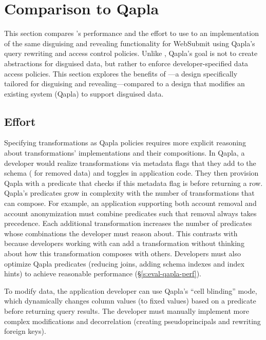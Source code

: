 \section{Comparison to Qapla}
\label{s:eval-qapla}

This section compares \sys's performance and the effort to use \sys to an
implementation of the same disguising and revealing functionality for WebSubmit
using Qapla’s query rewriting and access control policies. 
%
Unlike \sys, Qapla's goal is not to create abstractions for disguised data, but rather to enforce
developer-specified data access policies.
%
This section explores the benefits of \sys---a design specifically tailored for
disguising and revealing---compared to a design that modifies an existing system
(\ie Qapla) to support disguised data.
%

%
\subsection{Effort}
%
Specifying \xxing transformations as Qapla policies requires more
explicit reasoning about transformations' implementations and their
compositions.
%
In Qapla, a developer would realize \xxing transformations via metadata flags
that they add to the schema (\eg {} for removed data) and toggles in
application code. They then provision Qapla with a predicate that checks if
this metadata flag is  before returning a row.
%
Qapla's predicates grow in complexity
with the number of \xxing transformations that can compose. For example, an
application supporting both account removal and account anonymization must
combine predicates such that removal always takes precedence. Each additional
transformation increases the number of predicates whose combinations the
developer must reason about.
%
This contrasts with \sys because developers working with \sys can add 
a transformation without thinking about how this transformation composes
with others.
%
Developers must also optimize Qapla predicates (\eg reducing joins, adding
schema indexes and index hints) to achieve reasonable performance
(\S\ref{s:eval-qapla-perf}).

%
To modify data, the application developer can use Qapla's ``cell blinding''
mode, which dynamically changes column values (to fixed values) based on a
predicate before returning query results.
%
The developer must manually implement more complex modifications and
decorrelation (\ie creating pseudoprincipals and rewriting foreign keys).
%

